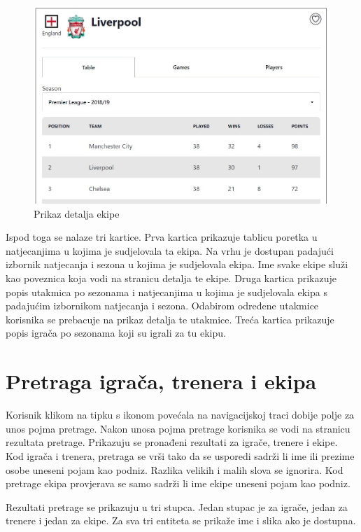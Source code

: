 \documentclass[times, utf8, zavrsni]{fer}
\begin{document}
\begin{figure}[htb]
\centering
\includegraphics[width=14cm]{images/team.jpg}
\caption{Prikaz detalja ekipe}
\label{fig:per-season}
\end{figure}

Ispod toga se nalaze tri kartice. Prva kartica prikazuje tablicu poretka u natjecanjima u kojima je sudjelovala ta ekipa. Na vrhu je dostupan padajući izbornik natjecanja i sezona u kojima je sudjelovala ekipa.
Ime svake ekipe služi kao poveznica koja vodi na stranicu detalja te ekipe.
Druga kartica prikazuje popis utakmica po sezonama i natjecanjima u kojima je sudjelovala ekipa s padajućim izbornikom natjecanja i sezona. Odabirom određene utakmice korisnika se prebacuje na prikaz detalja te utakmice.
Treća kartica prikazuje popis igrača po sezonama koji su igrali za tu ekipu.

\section{Pretraga igrača, trenera i ekipa}

Korisnik klikom na tipku s ikonom povećala na navigacijskoj traci dobije polje za unos pojma pretrage. Nakon unosa pojma pretrage korisnika se vodi na stranicu rezultata pretrage.
Prikazuju se pronađeni rezultati za igrače, trenere i ekipe.
Kod igrača i trenera, pretraga se vrši tako da se usporedi sadrži li ime ili prezime osobe uneseni pojam kao podniz.
Razlika velikih i malih slova se ignorira. Kod pretrage ekipa provjerava se samo sadrži li ime ekipe uneseni pojam kao podniz.

Rezultati pretrage se prikazuju u tri stupca. Jedan stupac je za igrače, jedan za trenere i jedan za ekipe. Za sva tri entiteta se prikaže ime i slika ako je dostupna.
\end{document}
